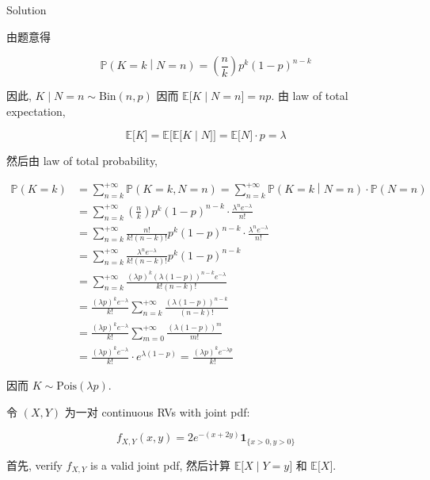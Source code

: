 \documentclass{qlnotes-export}
\begin{document}
\begin{qlsolution}{Solution}

由题意得

\[\left. {\mathbb{P}}(K = k \middle| N = n) = \left( \frac{n}{k} \right)p^{k}(1 - p)^{n - k} \right.\]

因此, \(\left. K \middle| N = n \sim \text{Bin}(n,p) \right.\) 因而 \(\left. {\mathbb{E}}\lbrack K \middle| N = n\rbrack = np \right.\). 由 law of total expectation,

\[\left. {\mathbb{E}}\lbrack K\rbrack = {\mathbb{E}}\lbrack{\mathbb{E}}\lbrack K \middle| N\rbrack\rbrack = {\mathbb{E}}\lbrack N\rbrack \cdot p = \lambda \right.\]

然后由 law of total probability,

\[\begin{matrix}
{{\mathbb{P}}(K = k)} & \left. = \sum\limits_{n = k}^{+ \infty}{\mathbb{P}}(K = k,N = n) = \sum\limits_{n = k}^{+ \infty}{\mathbb{P}}(K = k \middle| N = n) \cdot {\mathbb{P}}(N = n) \right. \\
 & {= \sum\limits_{n = k}^{+ \infty}\left( \frac{n}{k} \right)p^{k}(1 - p)^{n - k} \cdot \frac{\lambda^{n}e^{- \lambda}}{n!}} \\
 & {= \sum\limits_{n = k}^{+ \infty}\frac{n!}{k!(n - k)!}p^{k}(1 - p)^{n - k} \cdot \frac{\lambda^{n}e^{- \lambda}}{n!}} \\
 & {= \sum\limits_{n = k}^{+ \infty}\frac{\lambda^{n}e^{- \lambda}}{k!(n - k)!}p^{k}(1 - p)^{n - k}} \\
 & {= \sum\limits_{n = k}^{+ \infty}\frac{(\lambda p)^{k}(\lambda(1 - p))^{n - k}e^{- \lambda}}{k!(n - k)!}} \\
 & {= \frac{(\lambda p)^{k}e^{- \lambda}}{k!}\sum\limits_{n = k}^{+ \infty}\frac{(\lambda(1 - p))^{n - k}}{(n - k)!}} \\
 & {= \frac{(\lambda p)^{k}e^{- \lambda}}{k!}\sum\limits_{m = 0}^{+ \infty}\frac{(\lambda(1 - p))^{m}}{m!}} \\
 & {= \frac{(\lambda p)^{k}e^{- \lambda}}{k!} \cdot e^{\lambda(1 - p)} = \frac{(\lambda p)^{k}e^{- \lambda p}}{k!}}
\end{matrix}\]

因而 \(K \sim \text{Pois}(\lambda p)\).

\end{qlsolution}

\begin{example}

令 \((X,Y)\) 为一对 continuous RVs with joint pdf:

\[f_{X,Y}(x,y) = 2e^{- (x + 2y)}\mathbf{1}_{\{{x > 0,y > 0}\}}\]

首先, verify \(f_{X,Y}\) is a valid joint pdf, 然后计算 \(\left. {\mathbb{E}}\lbrack X \middle| Y = y\rbrack \right.\) 和 \({\mathbb{E}}\lbrack X\rbrack\).

\end{example}
\end{document}
